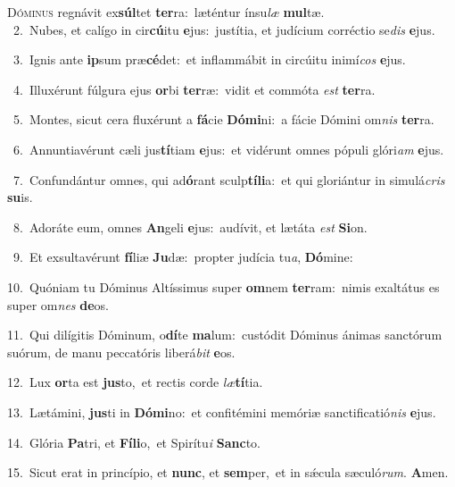 \lettrine{\initial\textcolor{\initialcolor}{D}}{óminus} regnávit ex\-\textbf{súl}\-tet \textbf{ter}\-ra:~\star læténtur ínsu\textit{læ} \textbf{mul}\-tæ.\\
{\numbfont\textcolor{\numbcolor}{~2.}}~Nubes, et calígo in cir\-\textbf{cú}\-itu \textbf{e}\-jus:~\star justítia, et judícium corréctio se\textit{dis} \textbf{e}\-jus.\par
{\numbfont\textcolor{\numbcolor}{~3.}}~Ignis ante \textbf{ip}\-sum præ\-\textbf{cé}\-det:~\star et inflammábit in circúitu inimí\textit{cos} \textbf{e}\-jus.\par
{\numbfont\textcolor{\numbcolor}{~4.}}~Illuxérunt fúlgura ejus \textbf{or}\-bi \textbf{ter}\-ræ:~\star vidit et commóta \textit{est} \textbf{ter}\-ra.\par
{\numbfont\textcolor{\numbcolor}{~5.}}~Montes, sicut cera fluxérunt a \textbf{fá}\-cie \textbf{Dó}\-\textbf{mi}ni:~\star a fácie Dómini om\textit{nis} \textbf{ter}\-ra.\par
{\numbfont\textcolor{\numbcolor}{~6.}}~Annuntiavérunt cæli jus\-\textbf{tí}\-tiam \textbf{e}\-jus:~\star et vidérunt omnes pópuli glóri\textit{am} \textbf{e}\-jus.\par
{\numbfont\textcolor{\numbcolor}{~7.}}~Confundántur omnes, qui ad\-\textbf{ó}\-rant sculp\-\textbf{tí}\-\textbf{li}a:~\star et qui gloriántur in simulá\textit{cris} \textbf{su}\-is.\par
{\numbfont\textcolor{\numbcolor}{~8.}}~Adoráte eum, omnes \textbf{An}\-geli \textbf{e}\-jus:~\star audívit, et lætáta \textit{est} \textbf{Si}\-on.\par
{\numbfont\textcolor{\numbcolor}{~9.}}~Et exsultavérunt \textbf{fí}\-liæ \textbf{Ju}\-dæ:~\star propter judícia tu\-\textit{a}\-, \textbf{Dó}\-mine:\par
{\numbfont\textcolor{\numbcolor}{10.}}~Quóniam tu Dóminus Altíssimus super \textbf{om}\-nem \textbf{ter}\-ram:~\star nimis exaltátus es super om\textit{nes} \textbf{de}\-os.\par
{\numbfont\textcolor{\numbcolor}{11.}}~Qui dilígitis Dóminum, o\-\textbf{dí}\-te \textbf{ma}\-lum:~\star custódit Dóminus ánimas sanctórum suórum, de manu peccatóris liberá\textit{bit} \textbf{e}\-os.\par
{\numbfont\textcolor{\numbcolor}{12.}}~Lux \textbf{or}\-ta est \textbf{jus}\-to,~\star et rectis corde \textit{læ}\-\textbf{tí}tia.\par
{\numbfont\textcolor{\numbcolor}{13.}}~Lætámini, \textbf{jus}\-ti in \textbf{Dó}\-\textbf{mi}no:~\star et confitémini memóriæ sanctificatió\textit{nis} \textbf{e}\-jus.\par
{\numbfont\textcolor{\numbcolor}{14.}}~Glória \textbf{Pa}\-tri, et \textbf{Fí}\-\textbf{li}o,~\star et Spirítu\textit{i} \textbf{Sanc}\-to.\par
{\numbfont\textcolor{\numbcolor}{15.}}~Sicut erat in princípio, et \textbf{nunc}\-, et \textbf{sem}\-per,~\star et in sǽcula sæculó\-\textit{rum}\-. \textbf{A}\-men.\par
